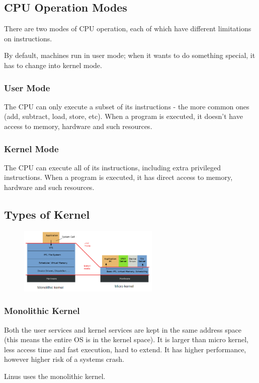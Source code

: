 \subsection{CPU Operation Modes}
There are two modes of CPU operation, each of which have different limitations on instructions.

By default, machines run in user mode; when it wants to do something special, it has to change into kernel mode. 
\subsubsection{User Mode}
The CPU can only execute a subset of its instructions - the more common ones (add, subtract, load, store, etc). When a program is executed, it doesn't have access to memory, hardware and such resources.
\subsubsection{Kernel Mode}
The CPU can execute all of its instructions, including extra privileged instructions. When a program is executed, it has direct access to memory, hardware and such resources.

\subsection{Types of Kernel}
\begin{figure}[H]
    \centering
    \includegraphics[width=0.6\textwidth]{assets/kernel-types.png}
\end{figure}
\subsubsection{Monolithic Kernel}
Both the user services and kernel services are kept in the same address space (this means the entire OS is in the kernel space). It is larger than micro kernel, less access time and fast execution, hard to extend. It has higher performance, however higher risk of a systems crash.

Linus uses the monolithic kernel.

